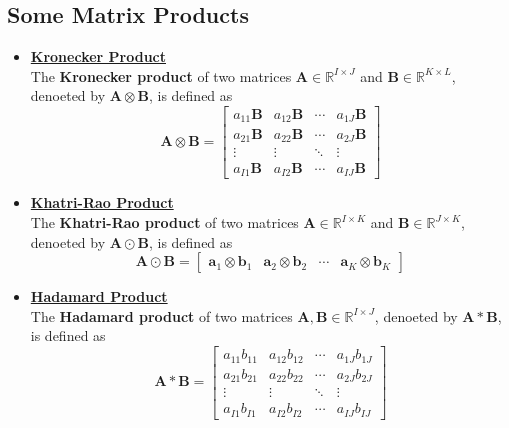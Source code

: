 \documentclass[final]{elsarticle}
\begin{document}
\subsection{Some Matrix Products}
\begin{itemize}
    \item \underline{\textbf{Kronecker Product}}\\[0.3cm]
    The \textbf{Kronecker product} of two matrices $\mathbf{A}\in\mathbb{R}^{I\times J}$ and $\mathbf{B}\in\mathbb{R}^{K\times L}$,
    denoeted by $\mathbf{A}\otimes\mathbf{B}$, is defined as
    \begin{equation}
        \mathbf{A}\otimes\mathbf{B}=\begin{bmatrix}
            a_{11}\mathbf{B} & a_{12}\mathbf{B} & \cdots & a_{1J}\mathbf{B} \\
            a_{21}\mathbf{B} & a_{22}\mathbf{B} & \cdots & a_{2J}\mathbf{B} \\
            \vdots & \vdots & \ddots & \vdots \\
            a_{I1}\mathbf{B} & a_{I2}\mathbf{B} & \cdots & a_{IJ}\mathbf{B}
        \end{bmatrix}
    \end{equation}
    \item \underline{\textbf{Khatri-Rao Product}}\\[0.3cm]
    The \textbf{Khatri-Rao product} of two matrices $\mathbf{A}\in\mathbb{R}^{I\times K}$ and $\mathbf{B}\in\mathbb{R}^{J\times K}$,
    denoeted by $\mathbf{A}\odot\mathbf{B}$, is defined as
    \begin{equation}
        \mathbf{A}\odot\mathbf{B}=\begin{bmatrix}
            \mathbf{a}_{1}\otimes\mathbf{b}_1 & \mathbf{a}_{2}\otimes\mathbf{b}_2 & \cdots & \mathbf{a}_{K}\otimes\mathbf{b}_K
        \end{bmatrix}
    \end{equation}
    \item \underline{\textbf{Hadamard Product}}\\[0.3cm]
    The \textbf{Hadamard product} of two matrices $\mathbf{A}, \mathbf{B}\in\mathbb{R}^{I\times J}$,
    denoeted by $\mathbf{A}*\mathbf{B}$, is defined as
    \begin{equation}
        \mathbf{A}*\mathbf{B}=\begin{bmatrix}
            a_{11}b_{11} & a_{12}b_{12} & \cdots & a_{1J}b_{1J} \\
            a_{21}b_{21} & a_{22}b_{22} & \cdots & a_{2J}b_{2J} \\
            \vdots & \vdots & \ddots & \vdots \\
            a_{I1}b_{I1} & a_{I2}b_{I2} & \cdots & a_{IJ}b_{IJ}
        \end{bmatrix}
    \end{equation}
\end{itemize}
\end{document}
